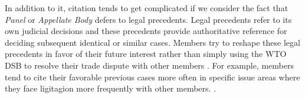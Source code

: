 In addition to it, citation tends to get complicated
if we consider the fact that \textit{Panel} or \textit{Appellate Body} defers to legal precedents.
Legal precedents refer to its own judicial decisions
and these precedents provide authoritative reference
for deciding subsequent identical or similar cases.
Members try to reshape these legal precedents
in favor of their future interest rather than
simply using the WTO DSB to resolve their trade
dispute with other members \citep{pelc}. For example,
members tend to cite their
favorable previous cases more often in specific issue areas where they face ligitagion more frequently with other members.
\citep{latent}.


